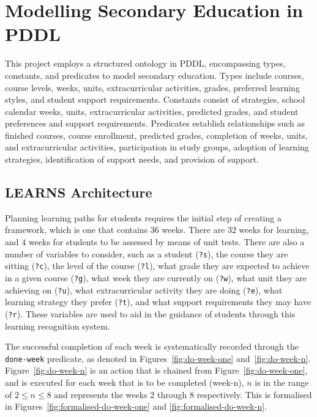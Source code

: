 \section{Modelling Secondary Education in PDDL}
This project employs a structured ontology in PDDL, encompassing types, constants, and predicates to model secondary education. Types include courses, course levels, weeks, units, extracurricular activities, grades, preferred learning styles, and student support requirements. Constants consist of strategies, school calendar weeks, units, extracurricular activities, predicted grades, and student preferences and support requirements. Predicates establish relationships such as finished courses, course enrollment, predicted grades, completion of weeks, units, and extracurricular activities, participation in study groups, adoption of learning strategies, identification of support needs, and provision of support.

\subsection{LEARNS Architecture}
Planning learning paths for students requires the initial step of creating a framework, which is one that contains 36 weeks. There are $32$ weeks for learning, and $4$ weeks for students to be assessed by means of unit tests. There are also a number of variables to consider, such as a student (\texttt{?s}), the course they are sitting (\texttt{?c}), the level of the course (\texttt{?l}), what grade they are expected to achieve in a given course (\texttt{?g}), what week they are currently on (\texttt{?w}), what unit they are achieving on (\texttt{?u}), what extracurricular activity they are doing (\texttt{?e}), what learning strategy they prefer (\texttt{?t}), and what support requirements they may have (\texttt{?r}). These variables are used to aid in the guidance of students through this learning recognition system.

The successful completion of each week is systematically recorded through the \texttt{done-week} predicate, as denoted in Figures~\ref{fig:do-week-one} and~\ref{fig:do-week-n}. Figure~\ref{fig:do-week-n} is an action that is chained from Figure~\ref{fig:do-week-one}, and is executed for each week that is to be completed (week-n), $n$ is in the range of $2 \leq n \leq 8$ and represents the weeks $2$ through $8$ respectively. This is formalised in Figures~\ref{fig:formalised-do-week-one} and \ref{fig:formalised-do-week-n}.




